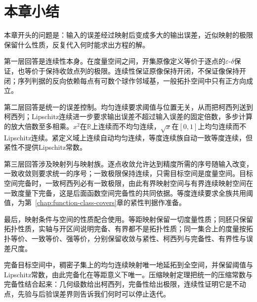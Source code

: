 \section{本章小结}
\label{sec:mmap-summary}

本章开头的问题是：输入的误差经过映射后变成多大的输出误差，近似映射的极限保留什么性质，反复代入何时能求出方程的解。

第一层回答是连续性本身。在度量空间之间，开集原像定义等价于逐点的$\varepsilon$-$\delta$保证，也等价于保持收敛点列的极限。连续性保证原像保持开闭，不保证像保持开闭；序列判据的反向依赖每点有可数个球作邻域基，一般拓扑空间中只有正方向成立。

第二层回答是统一的误差控制。均匀连续要求阈值与位置无关，从而把柯西列送到柯西列；Lipschitz连续进一步要求输出误差不超过输入误差的固定倍数，多步计算的放大倍数至多相乘。$x^2$在$\mathbb R$上连续而不均匀连续，$\sqrt x$在$[0,1]$上均匀连续而不Lipschitz连续。紧定义域上连续自动均匀连续，等度连续族自动一致等度连续，但紧性不提供Lipschitz常数。

第三层回答涉及映射列与映射族。逐点收敛允许达到精度所需的序号随输入改变，一致收敛则要求统一的序号；一致极限保持连续，只需目标空间是度量空间。目标空间完备时，一致柯西列必有一致极限，由此有界映射空间与有界连续映射空间在一致度量下完备，这是后面函数空间完备性的共同依据。等度连续要求全族共用阈值，为第~\ref{chap:function-class-covers}章的紧性判据作准备。

最后，映射条件与空间的性质配合使用。等距映射保留一切度量性质；同胚只保留拓扑性质，实轴与开区间说明完备、有界都不是拓扑性质；同一集合上的度量按拓扑等价、一致等价、强等价，分别保留收敛与紧性、柯西列与完备性、有界性与误差尺度。

完备目标空间中，稠密子集上的均匀连续映射唯一地延拓到全空间，并保留阈值与Lipschitz常数，由此完备化在等距意义下唯一。压缩映射定理把统一的压缩常数与完备性结合起来：几何级数给出柯西列，完备性给出极限，连续性证明它是不动点，先验与后验误差界则告诉我们何时可以停止迭代。
